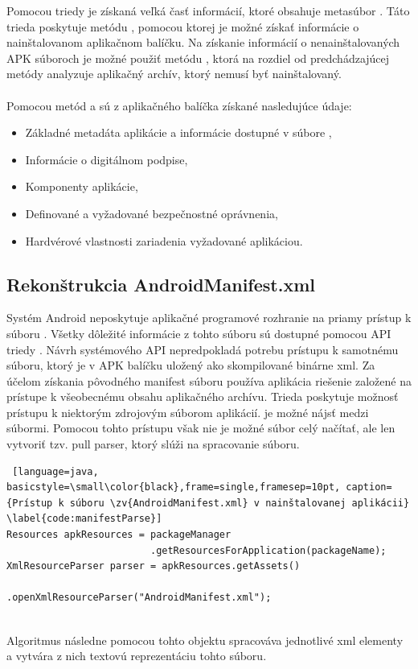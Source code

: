 Pomocou triedy  je získaná veľká časť informácií, ktoré obsahuje metasúbor . Táto trieda poskytuje metódu , pomocou ktorej je možné získať informácie o nainštalovanom aplikačnom balíčku. Na získanie informácií o nenainštalovaných APK súboroch je možné použiť metódu , ktorá na rozdiel od predchádzajúcej metódy analyzuje aplikačný archív, ktorý nemusí byť nainštalovaný.
\\\\
\noindent Pomocou metód  a  sú z aplikačného balíčka získané nasledujúce údaje:
\begin{itemize}
	\item Základné metadáta aplikácie a informácie dostupné v súbore ,
	\item Informácie o digitálnom podpise,
	\item Komponenty aplikácie,
	\item Definované a vyžadované bezpečnostné oprávnenia,
	\item Hardvérové vlastnosti zariadenia vyžadované aplikáciou.
\end{itemize}

\subsection{Rekonštrukcia AndroidManifest.xml}
Systém Android neposkytuje aplikačné programové rozhranie na priamy prístup k súboru . Všetky dôležité informácie z tohto súboru sú dostupné pomocou API triedy . Návrh systémového API nepredpokladá potrebu prístupu k samotnému  súboru, ktorý je v APK balíčku uložený ako skompilované binárne xml.  Za účelom získania pôvodného manifest súboru používa aplikácia  riešenie založené na prístupe k všeobecnému obsahu aplikačného archívu. Trieda  poskytuje možnosť prístupu k niektorým zdrojovým súborom aplikácií.  je možné nájsť medzi 
 súbormi. Pomocou tohto prístupu však nie je možné súbor celý načítať, ale len vytvoriť tzv. pull parser, ktorý slúži na spracovanie  súboru. 
\begin{lstlisting} [language=java, basicstyle=\small\color{black},frame=single,framesep=10pt, caption= {Prístup k súboru \zv{AndroidManifest.xml} v nainštalovanej aplikácii} \label{code:manifestParse}]
Resources apkResources = packageManager
                         .getResourcesForApplication(packageName);
XmlResourceParser parser = apkResources.getAssets()
                         .openXmlResourceParser("AndroidManifest.xml");
\end{lstlisting}
\mbox{}\\
\noindent Algoritmus následne pomocou tohto objektu spracováva jednotlivé xml elementy a vytvára z nich textovú reprezentáciu tohto súboru.

